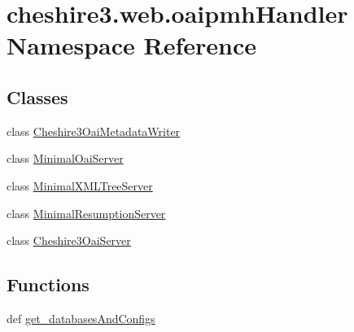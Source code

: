 \hypertarget{namespacecheshire3_1_1web_1_1oaipmh_handler}{\section{cheshire3.\-web.\-oaipmh\-Handler Namespace Reference}
\label{namespacecheshire3_1_1web_1_1oaipmh_handler}
}
\subsection*{Classes}
\begin{DoxyCompactItemize}
\item 
class \hyperlink{classcheshire3_1_1web_1_1oaipmh_handler_1_1_cheshire3_oai_metadata_writer}{Cheshire3\-Oai\-Metadata\-Writer}
\item 
class \hyperlink{classcheshire3_1_1web_1_1oaipmh_handler_1_1_minimal_oai_server}{Minimal\-Oai\-Server}
\item 
class \hyperlink{classcheshire3_1_1web_1_1oaipmh_handler_1_1_minimal_x_m_l_tree_server}{Minimal\-X\-M\-L\-Tree\-Server}
\item 
class \hyperlink{classcheshire3_1_1web_1_1oaipmh_handler_1_1_minimal_resumption_server}{Minimal\-Resumption\-Server}
\item 
class \hyperlink{classcheshire3_1_1web_1_1oaipmh_handler_1_1_cheshire3_oai_server}{Cheshire3\-Oai\-Server}
\end{DoxyCompactItemize}
\subsection*{Functions}
\begin{DoxyCompactItemize}
\item 
def \hyperlink{namespacecheshire3_1_1web_1_1oaipmh_handler_a2eea3a427825a61c6fc70cf614d4056e}{get\-\_\-databases\-And\-Configs}
\end{DoxyCompactItemize}
